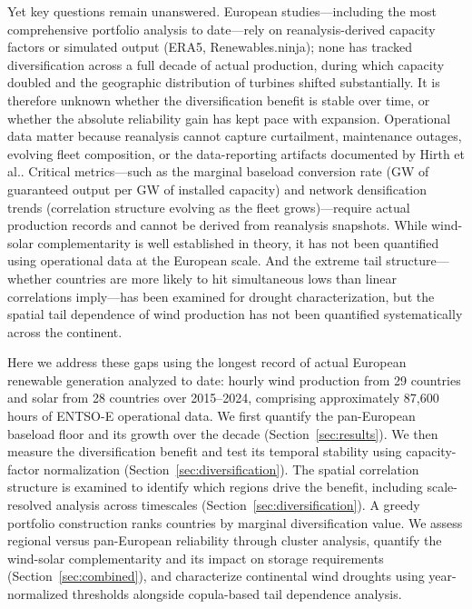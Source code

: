 \documentclass[sn-nature]{sn-jnl}%
\begin{document}
Yet key questions remain unanswered. European studies---including the most comprehensive portfolio analysis to date\cite{lopezprol2024}---rely on reanalysis-derived capacity factors or simulated output (ERA5, Renewables.ninja\cite{staffell2016}); none has tracked diversification across a full decade of actual production, during which capacity doubled and the geographic distribution of turbines shifted substantially. It is therefore unknown whether the diversification benefit is stable over time, or whether the absolute reliability gain has kept pace with expansion. Operational data matter because reanalysis cannot capture curtailment, maintenance outages, evolving fleet composition, or the data-reporting artifacts documented by Hirth et al.\cite{hirth2018}. Critical metrics---such as the marginal baseload conversion rate (GW of guaranteed output per GW of installed capacity) and network densification trends (correlation structure evolving as the fleet grows)---require actual production records and cannot be derived from reanalysis snapshots. While wind-solar complementarity is well established in theory, it has not been quantified using operational data at the European scale. And the extreme tail structure---whether countries are more likely to hit simultaneous lows than linear correlations imply---has been examined for drought characterization\cite{otero2022copula}, but the spatial tail dependence of wind production has not been quantified systematically across the continent.

Here we address these gaps using the longest record of actual European renewable generation analyzed to date: hourly wind production from 29 countries and solar from 28 countries over 2015--2024, comprising approximately 87,600 hours of ENTSO-E operational data. We first quantify the pan-European baseload floor and its growth over the decade (Section~\ref{sec:results}). We then measure the diversification benefit and test its temporal stability using capacity-factor normalization (Section~\ref{sec:diversification}). The spatial correlation structure is examined to identify which regions drive the benefit, including scale-resolved analysis across timescales (Section~\ref{sec:diversification}). A greedy portfolio construction ranks countries by marginal diversification value. We assess regional versus pan-European reliability through cluster analysis, quantify the wind-solar complementarity and its impact on storage requirements (Section~\ref{sec:combined}), and characterize continental wind droughts using year-normalized thresholds alongside copula-based tail dependence analysis.
\end{document}
